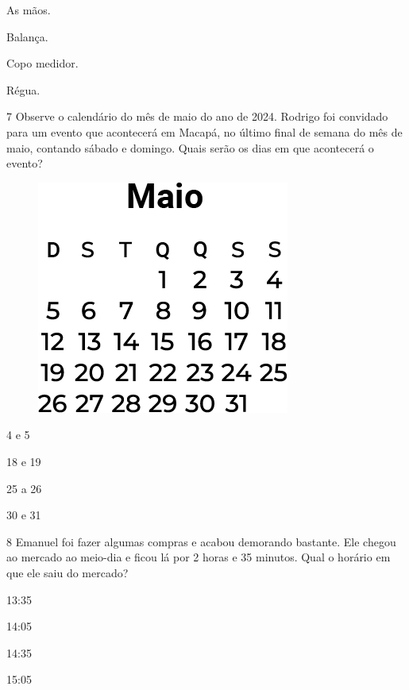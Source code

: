 \begin{escolha}[itemsep=-5pt]
\item As mãos.

\item Balança.

\item Copo medidor.

\item Régua.
\end{escolha}

\num{7} Observe o calendário do mês de maio do ano de 2024. Rodrigo foi
convidado para um evento que acontecerá em Macapá, no último final de
semana do mês de maio, contando sábado e domingo. Quais serão os dias em que acontecerá o evento?

\begin{figure}[H]
\centering
\includegraphics[width=.35\textwidth]{./media/image155.png}
\end{figure}

\begin{escolha}[itemsep=-5pt]
\begin{multicols}{2}
\item 4 e 5

\item 18 e 19

\item 25 a 26

\item 30 e 31
\end{multicols}
\end{escolha}

\num{8} Emanuel foi fazer algumas compras e acabou demorando bastante. Ele chegou ao mercado ao meio-dia e ficou lá por 2 horas e 35 minutos. Qual
o horário em que ele saiu do mercado?

\begin{escolha}[itemsep=-5pt]
\item 13:35

\item 14:05

\item 14:35

\item 15:05
\end{escolha}

